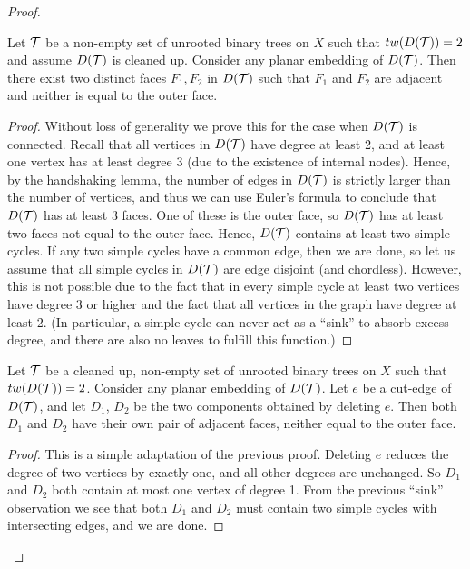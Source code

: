 \begin{proof}
\begin{observation}
\label{obs:adj}
Let ${\mathcal T}$ be a non-empty set of unrooted binary trees on $X$ such that $tw(D({\mathcal T})) = 2$ and assume $D({\mathcal T})$ is cleaned up. Consider any planar embedding of $D({\mathcal T})$. Then there exist two distinct faces $F_1, F_2$ in $D({\mathcal T})$ such that $F_1$ and $F_2$ are adjacent and neither is equal to the outer face.
\end{observation}
\begin{proof}
Without loss of generality we prove this for the case when $D({\mathcal T})$ is connected. Recall that all vertices in $D({\mathcal T})$ have degree at least 2, and at least one vertex has at least degree 3 (due to the existence of internal nodes). Hence, by the handshaking lemma, the number of edges in $D({\mathcal T})$ is strictly larger than the number of vertices, and thus we can use Euler's formula to conclude that $D({\mathcal T})$ has at least 3 faces. One of these is the outer face, so $D({\mathcal T})$ has at least two faces not equal to the outer face. Hence, $D({\mathcal T})$ contains at least two simple cycles. If any two simple cycles have a common edge, then we are done, so let us assume that all simple cycles in $D({\mathcal T})$ are edge disjoint (and chordless). However, this is not possible due to the fact that in every simple cycle at least two vertices have degree 3 or higher %
and the fact that all vertices in the graph have degree at least 2. (In particular, a simple cycle can never act as a ``sink'' to absorb excess degree, and there are also no leaves to fulfill this function.)
\end{proof}

\begin{observation}
\label{obs:adj2}
Let ${\mathcal T}$ be a cleaned up, non-empty set of unrooted binary trees on $X$ such that $tw(D({\mathcal T})) = 2$. Consider any planar embedding of $D({\mathcal T})$. Let $e$ be a cut-edge of $D({\mathcal T})$, and let $D_1$, $D_2$ be the two components obtained by deleting $e$. Then both $D_1$ and $D_2$ have their own pair of adjacent faces, neither equal to the outer face.
\end{observation}
\begin{proof}
This is a simple adaptation of the previous proof. Deleting $e$ reduces the degree of two vertices by exactly one, and all other degrees are unchanged. So $D_1$ and $D_2$ both contain at most one vertex of degree 1. %
From the previous ``sink'' observation we see that both $D_1$ and $D_2$ must contain two simple cycles with intersecting edges, and we are done.
\end{proof}


\end{proof}
